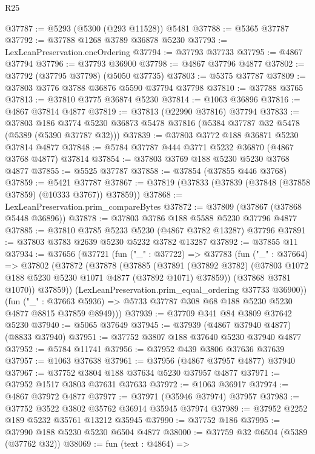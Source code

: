 \begin{lexlean}{R25}
\begin{coremodule}
@37787 := @5293 (@5300 (@293 @11528)) @5481
@37788 := @5365 @37787
@37792 := @37788 @1268 @3789 @36878 @5230
@37793 := LexLeanPreservation.encOrdering
@37794 := @37793 @37733
@37795 := @4867 @37794
@37796 := @37793 @36900
@37798 := @4867 @37796 @4877
@37802 := @37792 (@37795 @37798) (@5050 @37735)
@37803 := @5375 @37787
@37809 := @37803 @3776 @3788 @36876 @5590 @37794 @37798
@37810 := @37788 @3765
@37813 := @37810 @3775 @36874 @5230
@37814 := @1063 @36896
@37816 := @4867 @37814 @4877
@37819 := @37813 (@22990 @37816) @37794
@37833 := @37803
    @186
    @3774
    @5230
    @36873
    @5478
    @37816
    (@5384 @37787 @32 @5478 (@5389 (@5390 @37787 @32)))
@37839 := @37803 @3772 @188 @36871 @5230 @37814 @4877
@37848 := @5784 @37787 @444 @3771 @5232 @36870 (@4867 @3768 @4877) @37814
@37854 := @37803 @3769 @188 @5230 @5230 @3768 @4877
@37855 := @5525 @37787
@37858 := @37854 (@37855 @446 @3768)
@37859 := @5421 @37787
@37867 := @37819 (@37833 (@37839 (@37848 (@37858 @37859) (@10333 @3767)) @37859))
@37868 := LexLeanPreservation.prim_compareBytes
@37872 := @37809 (@37867 (@37868 @5448 @36896))
@37878 := @37803 @3786 @188 @5588 @5230 @37796 @4877
@37885 := @37810 @3785 @5233 @5230 (@4867 @3782 @13287) @37796
@37891 := @37803 @3783 @2639 @5230 @5232 @3782 @13287
@37892 := @37855 @11
@37934 := @37656
    (@37721
      (fun ("_" : @37722) =>
      @37783
        (fun ("_" : @37664) =>
        @37802
          (@37872
            (@37878
              (@37885
                (@37891
                  (@37892 @3782)
                  (@37803 @1072 @188 @5230 @5230 @1071 @4877 (@37892 @1071) @37859))
                (@37868 @3781 @1070))
              @37859))
          (LexLeanPreservation.prim_equal_ordering @37733 @36900))
        (fun ("_" : @37663 @5936) =>
        @5733 @37787 @308 @68 @188 @5230 @5230 @4877 @8815 @37859 @8949)))
@37939 := @37709 @341 @84 @3809 @37642 @5230
@37940 := @5065 @37649
@37945 := @37939 (@4867 @37940 @4877) (@8833 @37940)
@37951 := @37752 @3807 @188 @37640 @5230 @37940 @4877
@37952 := @5784 @11741
@37956 := @37952 @439 @3806 @37636 @37639
@37957 := @1063 @37638
@37961 := @37956 (@4867 @37957 @4877) @37940
@37967 := @37752 @3804 @188 @37634 @5230 @37957 @4877
@37971 := @37952 @1517 @3803 @37631 @37633
@37972 := @1063 @36917
@37974 := @4867 @37972 @4877
@37977 := @37971 (@35946 @37974) @37957
@37983 := @37752 @3522 @3802 @35762 @36914 @35945 @37974
@37989 := @37952 @2252 @189 @5232 @35761 @13212 @35945
@37990 := @37752 @186
@37995 := @37990 @188 @5230 @5230 @6504 @4877
@38000 := @37759 @32 @6504 (@5389 (@37762 @32))
@38069 := fun (text : @4864) =>

\end{coremodule}
\end{lexlean}
